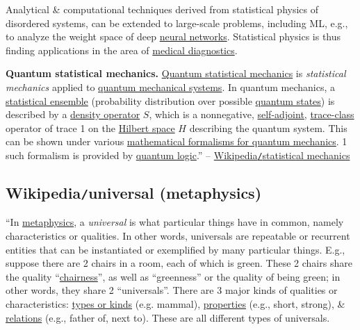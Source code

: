 \documentclass{article}
\begin{document}
Analytical \& computational techniques derived from statistical physics of disordered systems, can be extended to large-scale problems, including ML, e.g., to analyze the weight space of deep \href{https://en.wikipedia.org/wiki/Neural_networks}{neural networks}. Statistical physics is thus finding applications in the area of \href{https://en.wikipedia.org/wiki/Medical_diagnostics}{medical diagnostics}.

{\bf Quantum statistical mechanics.} \href{https://en.wikipedia.org/wiki/Quantum_statistical_mechanics}{Quantum statistical mechanics} is {\it statistical mechanics} applied to \href{https://en.wikipedia.org/wiki/Quantum_mechanics}{quantum mechanical systems}. In quantum mechanics, a \href{https://en.wikipedia.org/wiki/Statistical_ensemble_(mathematical_physics)}{statistical ensemble} (probability distribution over possible \href{https://en.wikipedia.org/wiki/Quantum_state}{quantum states}) is described by a \href{https://en.wikipedia.org/wiki/Density_matrix}{density operator} $S$, which is a nonnegative, \href{https://en.wikipedia.org/wiki/Self-adjoint}{self-adjoint}, \href{https://en.wikipedia.org/wiki/Trace-class}{trace-class} operator of trace 1 on the \href{https://en.wikipedia.org/wiki/Hilbert_space}{Hilbert space} $H$ describing the quantum system. This can be shown under various \href{https://en.wikipedia.org/wiki/Mathematical_formulation_of_quantum_mechanics}{mathematical formalisms for quantum mechanics}. 1 such formalism is provided by \href{https://en.wikipedia.org/wiki/Quantum_logic}{quantum logic}.'' -- \href{https://en.wikipedia.org/wiki/Statistical_mechanics}{Wikipedia{\tt/}statistical mechanics}


\subsection{Wikipedia{\tt/}universal (metaphysics)}
``In \href{https://en.wikipedia.org/wiki/Metaphysics}{metaphysics}, a {\it universal} is what particular things have in common, namely characteristics or qualities. In other words, universals are repeatable or recurrent entities that can be instantiated or exemplified by many particular things. E.g., suppose there are 2 chairs in a room, each of which is green. These 2 chairs share the quality ``\href{https://en.wiktionary.org/wiki/chairness}{chairness}'', as well as ``greenness'' or the quality of being green; in other words, they share 2 ``universals''. There are 3 major kinds of qualities or characteristics: \href{https://en.wikipedia.org/wiki/Type_(metaphysics)}{types or kinds} (e.g. mammal), \href{https://en.wikipedia.org/wiki/Property_(metaphysics)}{properties} (e.g., short, strong), \& \href{https://en.wikipedia.org/wiki/Relation_(metaphysics)}{relations} (e.g., father of, next to). These are all different types of universals.
\end{document}
